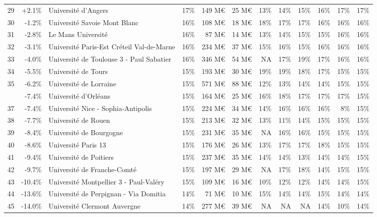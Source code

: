 \documentclass[12pt,french,landscape]{article}
\begin{document}
\begin{longtable}{rrlrrrrrrlrr}
\rowcolor{gray!6}  29 & +2.1\% & Université d'Angers & 17\% & 149 M€ & 25 M€ & 13\% & 14\% & 15\% & 16\% & 17\% & 17\%\\
30 & -1.2\% & Université Savoie Mont Blanc & 16\% & 108 M€ & 18 M€ & 18\% & 17\% & 17\% & 16\% & 16\% & 16\%\\
\addlinespace
\rowcolor{gray!6}  31 & -2.8\% & Le Mans Université & 16\% & 87 M€ & 14 M€ & 13\% & 14\% & 15\% & 15\% & 16\% & 16\%\\
32 & -3.1\% & Université Paris-Est Créteil Val-de-Marne & 16\% & 234 M€ & 37 M€ & 15\% & 16\% & 15\% & 16\% & 16\% & 16\%\\
\rowcolor{gray!6}  33 & -4.0\% & Université de Toulouse 3 - Paul Sabatier & 16\% & 346 M€ & 54 M€ & NA & 17\% & 19\% & 17\% & 16\% & 16\%\\
34 & -5.5\% & Université de Tours & 15\% & 193 M€ & 30 M€ & 19\% & 19\% & 18\% & 17\% & 15\% & 15\%\\
\rowcolor{gray!6}  35 & -6.2\% & Université de Lorraine & 15\% & 571 M€ & 88 M€ & 12\% & 13\% & 14\% & 14\% & 15\% & 15\%\\
\addlinespace
36 & -7.4\% & Université d'Orléans & 15\% & 164 M€ & 25 M€ & 16\% & 18\% & 17\% & 17\% & 17\% & 15\%\\
\rowcolor{gray!6}  37 & -7.4\% & Université Nice - Sophia-Antipolis & 15\% & 224 M€ & 34 M€ & 14\% & 16\% & 16\% & 16\% & 8\% & 15\%\\
38 & -7.7\% & Université de Rouen & 15\% & 213 M€ & 32 M€ & 13\% & 11\% & 14\% & 15\% & 15\% & 15\%\\
\rowcolor{gray!6}  39 & -8.4\% & Université de Bourgogne & 15\% & 231 M€ & 35 M€ & NA & 16\% & 16\% & 15\% & 15\% & 15\%\\
40 & -8.6\% & Université Paris 13 & 15\% & 176 M€ & 26 M€ & 13\% & 17\% & 17\% & 18\% & 15\% & 15\%\\
\addlinespace
\rowcolor{gray!6}  41 & -9.4\% & Université de Poitiers & 15\% & 237 M€ & 35 M€ & 14\% & 14\% & 13\% & 14\% & 14\% & 15\%\\
42 & -9.7\% & Université de Franche-Comté & 15\% & 197 M€ & 29 M€ & NA & 17\% & 18\% & 14\% & 15\% & 15\%\\
\rowcolor{gray!6}  43 & -10.4\% & Université Montpellier 3 - Paul-Valéry & 15\% & 109 M€ & 16 M€ & 10\% & 12\% & 12\% & 14\% & 14\% & 15\%\\
44 & -13.6\% & Université de Perpignan - Via Domitia & 14\% & 71 M€ & 10 M€ & 15\% & 14\% & 14\% & 15\% & 14\% & 14\%\\
\rowcolor{gray!6}  45 & -14.0\% & Université Clermont Auvergne & 14\% & 277 M€ & 39 M€ & NA & NA & NA & 14\% & 10\% & 14\%\\

\end{longtable}
\end{document}
